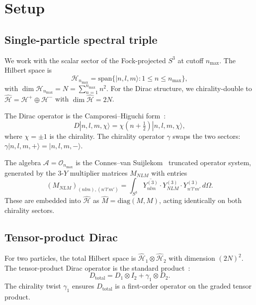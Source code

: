\documentclass[twocolumn,pra,amsmath,amssymb,superscriptaddress]{revtex4-2}
\begin{document}
\section{Setup}
\label{sec:setup}

\subsection{Single-particle spectral triple}

We work with the scalar sector of the Fock-projected $S^3$ at cutoff
$n_{\max}$. The Hilbert space is
\begin{equation}
  \mathcal{H}_{n_{\max}} =
  \mathrm{span}\{|n, l, m\rangle : 1 \le n \le n_{\max}\},
  \label{eq:H_scalar}
\end{equation}
with $\dim \mathcal{H}_{n_{\max}} = N = \sum_{n=1}^{n_{\max}} n^2$.
For the Dirac structure, we chirality-double to $\hat{\mathcal{H}} =
\mathcal{H}^+ \oplus \mathcal{H}^-$ with $\dim \hat{\mathcal{H}} =
2N$.

The Dirac operator is the Camporesi--Higuchi form~\cite{camporesi_higuchi1996}:
\begin{equation}
  D |n, l, m, \chi\rangle = \chi \left(n + \tfrac{1}{2}\right)
  |n, l, m, \chi\rangle,
  \label{eq:dirac}
\end{equation}
where $\chi = \pm 1$ is the chirality. The chirality operator
$\gamma$ swaps the two sectors: $\gamma |n, l, m, +\rangle = |n, l,
m, -\rangle$.

The algebra $\mathcal{A} = \mathcal{O}_{n_{\max}}$ is the Connes--van
Suijlekom~\cite{connes_vs2021} truncated operator system, generated
by the $3$-$Y$ multiplier matrices $M_{NLM}$ with entries
\begin{equation}
  (M_{NLM})_{(nlm),(n'l'm')} =
  \int_{S^3} \overline{Y^{(3)}_{nlm}} \cdot Y^{(3)}_{NLM}
  \cdot Y^{(3)}_{n'l'm'} \, d\Omega.
  \label{eq:multiplier}
\end{equation}
These are embedded into $\hat{\mathcal{H}}$ as $\hat{M} =
\mathrm{diag}(M, M)$, acting identically on both chirality sectors.

\subsection{Tensor-product Dirac}

For two particles, the total Hilbert space is $\hat{\mathcal{H}}_1
\otimes \hat{\mathcal{H}}_2$ with dimension $(2N)^2$. The
tensor-product Dirac operator is the standard
product~\cite{connes_book1994}:
\begin{equation}
  D_{\mathrm{total}} = D_1 \otimes I_2 + \gamma_1 \otimes D_2.
  \label{eq:D_total}
\end{equation}
The chirality twist $\gamma_1$ ensures $D_{\mathrm{total}}$ is a
first-order operator on the graded tensor product.
\end{document}
